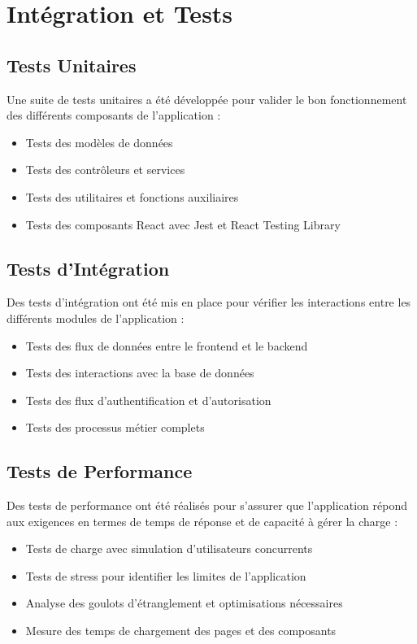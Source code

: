 \section{Intégration et Tests}

\subsection{Tests Unitaires}

Une suite de tests unitaires a été développée pour valider le bon fonctionnement des différents composants de l'application :

\begin{itemize}
  \item Tests des modèles de données
  \item Tests des contrôleurs et services
  \item Tests des utilitaires et fonctions auxiliaires
  \item Tests des composants React avec Jest et React Testing Library
\end{itemize}

\subsection{Tests d'Intégration}

Des tests d'intégration ont été mis en place pour vérifier les interactions entre les différents modules de l'application :

\begin{itemize}
  \item Tests des flux de données entre le frontend et le backend
  \item Tests des interactions avec la base de données
  \item Tests des flux d'authentification et d'autorisation
  \item Tests des processus métier complets
\end{itemize}

\subsection{Tests de Performance}

Des tests de performance ont été réalisés pour s'assurer que l'application répond aux exigences en termes de temps de réponse et de capacité à gérer la charge :

\begin{itemize}
  \item Tests de charge avec simulation d'utilisateurs concurrents
  \item Tests de stress pour identifier les limites de l'application
  \item Analyse des goulots d'étranglement et optimisations nécessaires
  \item Mesure des temps de chargement des pages et des composants
\end{itemize}

